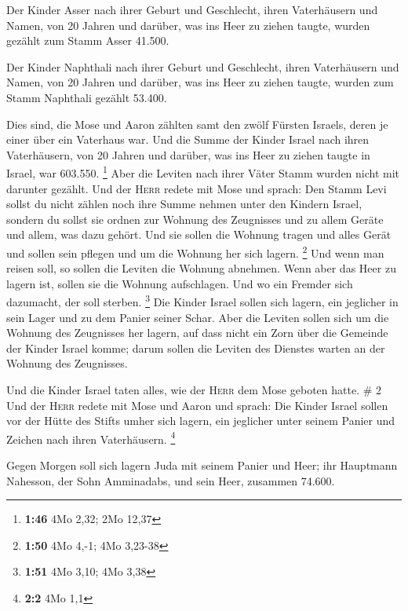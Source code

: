  Der Kinder Asser nach ihrer Geburt und Geschlecht, ihren
Vaterhäusern und Namen, von 20 Jahren und darüber, was ins Heer zu
ziehen taugte,  wurden gezählt zum Stamm Asser 41.500.

 Der Kinder Naphthali nach ihrer Geburt und Geschlecht,
ihren Vaterhäusern und Namen, von 20 Jahren und darüber, was ins Heer zu
ziehen taugte,  wurden zum Stamm Naphthali gezählt
53.400.

 Dies sind, die Mose und Aaron zählten samt den zwölf
Fürsten Israels, deren je einer über ein Vaterhaus war. 
Und die Summe der Kinder Israel nach ihren Vaterhäusern, von 20 Jahren
und darüber, was ins Heer zu ziehen taugte in Israel, 
war 603.550. \footnote{\textbf{1:46} 4Mo 2,32; 2Mo 12,37}
 Aber die Leviten nach ihrer Väter Stamm wurden nicht mit
darunter gezählt.  Und der \textsc{Herr} redete mit Mose
und sprach:  Den Stamm Levi sollst du nicht zählen noch
ihre Summe nehmen unter den Kindern Israel,  sondern du
sollst sie ordnen zur Wohnung des Zeugnisses und zu allem Geräte und
allem, was dazu gehört. Und sie sollen die Wohnung tragen und alles
Gerät und sollen sein pflegen und um die Wohnung her sich lagern.
\footnote{\textbf{1:50} 4Mo 4,-1; 4Mo 3,23-38}  Und wenn
man reisen soll, so sollen die Leviten die Wohnung abnehmen. Wenn aber
das Heer zu lagern ist, sollen sie die Wohnung aufschlagen. Und wo ein
Fremder sich dazumacht, der soll sterben. \footnote{\textbf{1:51} 4Mo
  3,10; 4Mo 3,38}  Die Kinder Israel sollen sich lagern,
ein jeglicher in sein Lager und zu dem Panier seiner Schar.
 Aber die Leviten sollen sich um die Wohnung des
Zeugnisses her lagern, auf dass nicht ein Zorn über die Gemeinde der
Kinder Israel komme; darum sollen die Leviten des Dienstes warten an der
Wohnung des Zeugnisses.

 Und die Kinder Israel taten alles, wie der \textsc{Herr}
dem Mose geboten hatte. \# 2  Und der \textsc{Herr} redete
mit Mose und Aaron und sprach:  Die Kinder Israel sollen
vor der Hütte des Stifts umher sich lagern, ein jeglicher unter seinem
Panier und Zeichen nach ihren Vaterhäusern. \footnote{\textbf{2:2} 4Mo
  1,1}

 Gegen Morgen soll sich lagern Juda mit seinem Panier und
Heer; ihr Hauptmann Nahesson, der Sohn Amminadabs,  und
sein Heer, zusammen 74.600.

